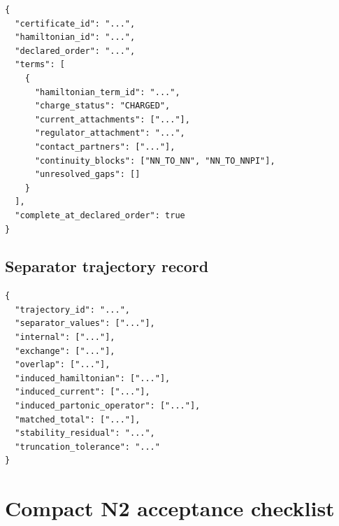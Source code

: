 \documentclass[11pt]{article}
\begin{document}
\begin{verbatim}
{
  "certificate_id": "...",
  "hamiltonian_id": "...",
  "declared_order": "...",
  "terms": [
    {
      "hamiltonian_term_id": "...",
      "charge_status": "CHARGED",
      "current_attachments": ["..."],
      "regulator_attachment": "...",
      "contact_partners": ["..."],
      "continuity_blocks": ["NN_TO_NN", "NN_TO_NNPI"],
      "unresolved_gaps": []
    }
  ],
  "complete_at_declared_order": true
}
\end{verbatim}

\subsection{Separator trajectory record}

\begin{verbatim}
{
  "trajectory_id": "...",
  "separator_values": ["..."],
  "internal": ["..."],
  "exchange": ["..."],
  "overlap": ["..."],
  "induced_hamiltonian": ["..."],
  "induced_current": ["..."],
  "induced_partonic_operator": ["..."],
  "matched_total": ["..."],
  "stability_residual": "...",
  "truncation_tolerance": "..."
}
\end{verbatim}

\section{Compact N2 acceptance checklist}
\end{document}
